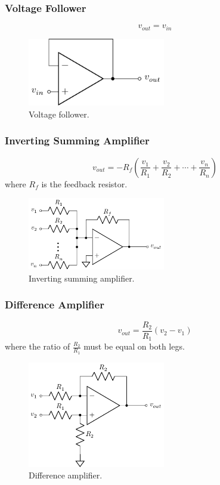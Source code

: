 \documentclass{article}
\begin{document}
\subsubsection{Voltage Follower}
\begin{equation*}
    v_{out} = v_{in}
\end{equation*}
\begin{figure}[H]
    \centering
    \includegraphics[width = 6cm, keepaspectratio = true]{figures/voltage_follower.pdf}
    \caption{Voltage follower.}
\end{figure}
\subsubsection{Inverting Summing Amplifier}
\begin{equation*}
    v_{out} = -R_f \left( \frac{v_1}{R_1} + \frac{v_2}{R_2} + \cdots + \frac{v_n}{R_n} \right)
\end{equation*}
where \(R_f\) is the feedback resistor.
\begin{figure}[H]
    \centering
    \includegraphics[width = 6cm, keepaspectratio = true]{figures/inverting_summing_amplifier.pdf}
    \caption{Inverting summing amplifier.}
\end{figure}
\subsubsection{Difference Amplifier}
\begin{equation*}
    v_{out} = \frac{R_2}{R_1} \left( v_2 - v_1 \right)
\end{equation*}
where the ratio of \(\displaystyle \frac{R_2}{R_1}\) must be equal on both legs.
\begin{figure}[H]
    \centering
    \includegraphics[width = 6cm, keepaspectratio = true]{figures/difference_amplifier.pdf}
    \caption{Difference amplifier.}
\end{figure}
\end{document}

